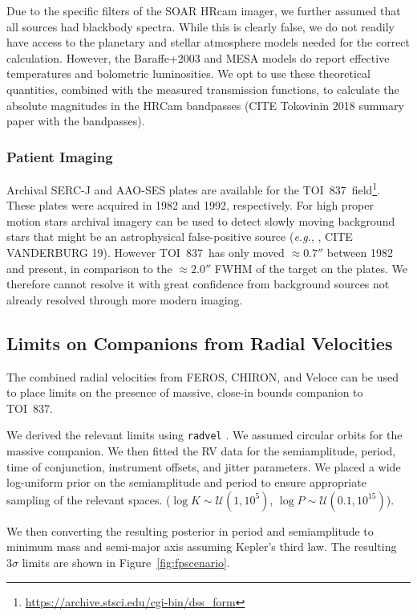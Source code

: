 \documentclass[12pt,twocolumn,tighten]{aastex62}
\newcommand{\tn}{TOI~837} %
\begin{document}
Due to the specific filters of the SOAR HRcam imager, we further
assumed that all sources had blackbody spectra. While this is clearly
false, we do not readily have access to the planetary and stellar
atmosphere models needed for the correct calculation. However, the
Baraffe+2003 and MESA models do report effective temperatures and
bolometric luminosities.  We opt to use these theoretical quantities,
combined with the measured transmission functions, to calculate the
absolute magnitudes in the HRCam bandpasses (CITE Tokovinin 2018
summary paper with the bandpasses).  

\subsubsection{Patient Imaging}
    Archival SERC-J and AAO-SES plates are available for the \tn\
field\footnote{\url{https://archive.stsci.edu/cgi-bin/dss_form}}.
These plates were acquired in 1982 and 1992, respectively.
For high proper motion stars archival imagery can be used to
detect slowly moving background stars that might be an
astrophysical false-positive source
({\it e.g.}, \citealt{huang_pimen_2018}, CITE VANDERBURG 19).
However \tn\ has only moved $\approx0.7''$ between 1982 and
present, in comparison to the $\approx2.0''$ FWHM of the target on
the plates.
We therefore cannot resolve it with great confidence from
background sources not already resolved through more modern
imaging.

\subsection{Limits on Companions from Radial Velocities}

The combined radial velocities from FEROS, CHIRON, and Veloce 
can be used to place limits on the presence of massive, close-in
bounds companion to \tn.

We derived the relevant limits using \texttt{radvel} \citep{fulton_radvel_2018}.
We assumed circular orbits for the massive companion.
We then fitted the RV data for the semiamplitude, period, time
of conjunction,
instrument offsets, and jitter parameters.
We placed a wide log-uniform prior on the semiamplitude
and period to ensure appropriate sampling of the relevant
spaces.
($\log K \sim \mathcal{U}(1,10^5)$, $\log P \sim \mathcal{U}(0.1, 10^{15})$).

We then converting the resulting posterior in period and semiamplitude
to minimum mass and semi-major axis assuming Kepler's third law.
The resulting $3\sigma$ limits are shown in Figure~\ref{fig:fpscenario}.
\end{document}
